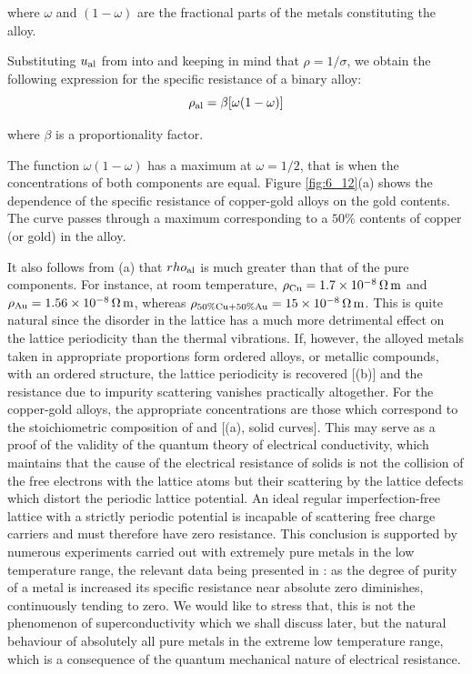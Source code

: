 \noindent
where $\omega$ and $(1-\omega)$ are the fractional parts of the metals constituting the alloy.

Substituting $u_{\text{al}}$ from  into  and keeping in mind that $\rho=1/\sigma$, we obtain the following expression for the specific resistance of a binary alloy:
\begin{equation}\label{eq:6_31}
	\rho_{\text{al}} = \beta [\omega (1-\omega)]
\end{equation}

\noindent
where $\beta$ is a proportionality factor.

The function $\omega (1-\omega)$ has a maximum at $\omega=1/2$, that is when the concentrations of both components are equal. Figure \ref{fig:6_12}(a) shows the dependence of the specific resistance of copper-gold alloys on the gold contents. The curve passes through a maximum corresponding to a $50\%$ contents of copper (or gold) in the alloy.

It also follows from (a) that $rho_{\text{al}}$ is much greater than that of the pure components. For instance, at room temperature, $\rho_{\text{Cu}}=\SI{1.7e-8}{\ohm\metre}$ and $\rho_{\text{Au}}=\SI{1.56e-8}{\ohm\metre}$, whereas $\rho_{\text{$50\%$Cu$+50\%$Au}}=\SI{15e-8}{\ohm\metre}$. This is quite natural since the disorder in the lattice has a much more detrimental effect on the lattice periodicity than the thermal vibrations.
If, however, the alloyed metals taken in appropriate proportions form ordered alloys, or metallic compounds, with an ordered structure, the lattice periodicity is recovered [(b)] and the resistance due to impurity scattering vanishes practically altogether. For the copper-gold alloys, the appropriate concentrations are those which correspond to the stoichiometric composition of  and  [(a), solid curves]. This may serve as a proof of the validity of the quantum theory of electrical conductivity, which maintains that the cause of the electrical resistance of solids is not the collision of the free electrons with the lattice atoms but their scattering by the lattice defects which distort the periodic lattice potential. An ideal regular imperfection-free lattice with a strictly periodic potential is incapable of scattering free charge carriers and must therefore have zero resistance. This conclusion is supported by numerous experiments carried out with extremely pure metals in the low temperature range, the relevant data being presented in : as the degree of purity of a metal is increased its specific resistance near absolute zero diminishes, continuously tending to zero. We would like to stress that, this is not the phenomenon of superconductivity which we shall discuss later, but the natural behaviour of absolutely all pure metals in the extreme low temperature range, which is a consequence of the quantum mechanical nature of electrical resistance.

